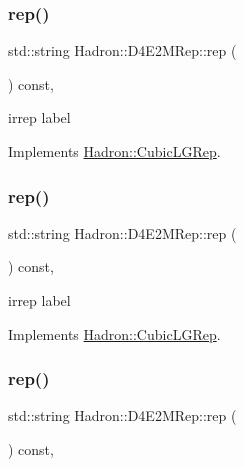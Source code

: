 \subsubsection{\texorpdfstring{rep()}{rep()}\hspace{0.1cm}{\footnotesize\ttfamily [1/3]}}
{\footnotesize\ttfamily std\+::string Hadron\+::\+D4\+E2\+M\+Rep\+::rep (\begin{DoxyParamCaption}{ }\end{DoxyParamCaption}) const\hspace{0.3cm}{\ttfamily [inline]}, {\ttfamily [virtual]}}

irrep label 

Implements \mbox{\hyperlink{structHadron_1_1CubicLGRep_a50f5ddbb8f4be4cee0106fa9e8c75e6c}{Hadron\+::\+Cubic\+L\+G\+Rep}}.

\mbox{\label{structHadron_1_1D4E2MRep_a51e2bdc02ee47b919e001f352e2b7297}} 
\subsubsection{\texorpdfstring{rep()}{rep()}\hspace{0.1cm}{\footnotesize\ttfamily [2/3]}}
{\footnotesize\ttfamily std\+::string Hadron\+::\+D4\+E2\+M\+Rep\+::rep (\begin{DoxyParamCaption}{ }\end{DoxyParamCaption}) const\hspace{0.3cm}{\ttfamily [inline]}, {\ttfamily [virtual]}}

irrep label 

Implements \mbox{\hyperlink{structHadron_1_1CubicLGRep_a50f5ddbb8f4be4cee0106fa9e8c75e6c}{Hadron\+::\+Cubic\+L\+G\+Rep}}.

\mbox{\label{structHadron_1_1D4E2MRep_a51e2bdc02ee47b919e001f352e2b7297}} 
\subsubsection{\texorpdfstring{rep()}{rep()}\hspace{0.1cm}{\footnotesize\ttfamily [3/3]}}
{\footnotesize\ttfamily std\+::string Hadron\+::\+D4\+E2\+M\+Rep\+::rep (\begin{DoxyParamCaption}{ }\end{DoxyParamCaption}) const\hspace{0.3cm}{\ttfamily [inline]}, {\ttfamily [virtual]}}

